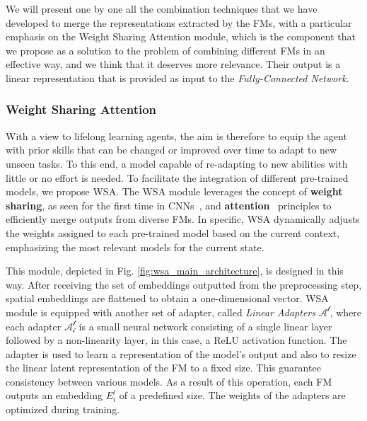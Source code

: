 We will present one by one all the combination techniques that we have developed to merge the representations extracted by the FMs, with a particular emphasis on the Weight Sharing Attention module, which is the component that we propose as a solution to the problem of combining different FMs in an effective way, and we think that it deserves more relevance.
Their output is a linear representation that is provided as input to the \textit{Fully-Connected Network}.

\subsubsection{Weight Sharing Attention}\label{subsubsec:wsa}
With a view to lifelong learning agents, the aim is therefore to equip the agent with prior skills that can be changed or improved over time to adapt to new unseen tasks.
To this end, a model capable of re-adapting to new abilities with little or no effort is needed.
To facilitate the integration of different pre-trained models, we propose WSA\@.
The WSA module leverages the concept of \textbf{weight sharing}, as seen for the first time in CNNs~\citep{fukushima1980neocognitron}, and \textbf{attention}~\citep{vaswani2017attention} principles to efficiently merge outputs from diverse FMs.
In specific, WSA dynamically adjusts the weights assigned to each pre-trained model based on the current context, emphasizing the most relevant models for the current state.

This module, depicted in Fig. \ref{fig:wsa_main_architecture}, is designed in this way.
After receiving the set of embeddings outputted from the preprocessing step, spatial embeddings are flattened to obtain a one-dimensional vector.
WSA module is equipped with another set of adapter, called \textit{Linear Adapters} $\mathcal{A^{l}}$, where each adapter $\mathcal{A^{l}_i}$ is a small neural network consisting of a single linear layer followed by a non-linearity layer, in this case, a ReLU activation function.
The adapter is used to learn a representation of the model's output and also to resize the linear latent representation of the FM to a fixed size.
This guarantee consistency between various models.
As a result of this operation, each FM outputs an embedding $E^{l}_i$ of a predefined size.
The weights of the adapters are optimized during training.

